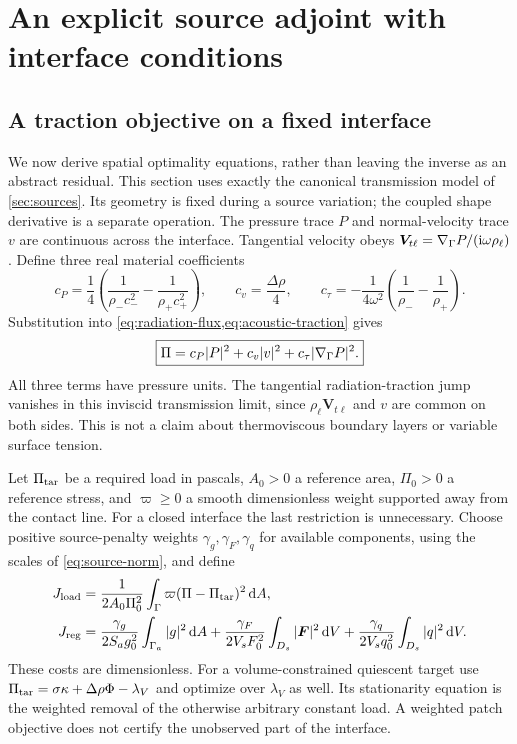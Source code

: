 \section{An explicit source adjoint with interface conditions}\label{sec:source-adjoint}

\subsection{A traction objective on a fixed interface}
We now derive spatial optimality equations, rather than leaving the inverse
as an abstract residual. This section uses exactly the canonical transmission
model of \cref{sec:sources}. Its geometry is fixed during a source variation;
the coupled shape derivative is a separate operation. The pressure trace $P$
and normal-velocity trace $v$ are continuous across the interface. Tangential
velocity obeys $\bm V_{t\ell}=\nabla_\Gamma P/(\mathrm i\omega\rho_\ell)$.
Define three real material coefficients
\begin{equation}
 c_P=\frac14\left(\frac{1}{\rho_-c_-^2}-\frac{1}{\rho_+c_+^2}\right),
 \qquad c_v=\frac{\Delta\rho}{4},\qquad
 c_\tau=-\frac{1}{4\omega^2}\left(\frac{1}{\rho_-}-\frac{1}{\rho_+}\right).
 \label{eq:traction-trace-coefficients}
\end{equation}
Substitution into \cref{eq:radiation-flux,eq:acoustic-traction} gives
\begin{equation}
 \boxed{\Pi=c_P|P|^2+c_v|v|^2+c_\tau|\nabla_\Gamma P|^2.}
 \label{eq:traction-trace}
\end{equation}
All three terms have pressure units. The tangential radiation-traction jump
vanishes in this inviscid transmission limit, since $\rho_\ell\bm V_{t\ell}$
and $v$ are common on both sides. This is not a claim about thermoviscous
boundary layers or variable surface tension.

Let $\Pi_{\rm tar}$ be a required load in pascals, $A_0>0$ a reference area,
$\Pi_0>0$ a reference stress, and $\varpi\geq0$ a smooth dimensionless
weight supported away from the contact line. For a closed interface the last
restriction is unnecessary. Choose positive source-penalty weights
$\gamma_g,\gamma_F,\gamma_q$ for available components, using the scales of
\cref{eq:source-norm}, and define
\begin{align}
 J_{\rm load}&=\frac{1}{2A_0\Pi_0^2}
             \int_\Gamma\varpi(\Pi-\Pi_{\rm tar})^2\,\mathrm d A,
             \label{eq:adjoint-load-cost}\\
 J_{\rm reg}&=\frac{\gamma_g}{2S_ag_0^2}\int_{\Gamma_a}|g|^2\,\mathrm d A
       +\frac{\gamma_F}{2V_sF_0^2}\int_{D_s}|\bm F|^2\,\mathrm d V
       +\frac{\gamma_q}{2V_sq_0^2}\int_{D_s}|q|^2\,\mathrm d V.
       \label{eq:adjoint-source-penalty}
\end{align}
These costs are dimensionless. For a volume-constrained quiescent target use
$\Pi_{\rm tar}=\sigma\kappa+\Delta\rho\Phi-\lambda_V$ and optimize over
$\lambda_V$ as well. Its stationarity equation is the weighted removal of
the otherwise arbitrary constant load. A weighted patch objective does not
certify the unobserved part of the interface.

